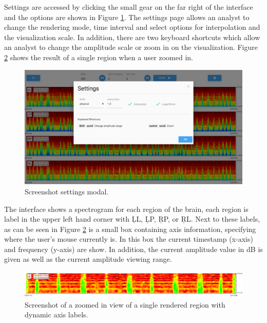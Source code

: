 Settings are accessed by clicking the small gear on the far right of the
interface and the options are shown in Figure \ref{fig:settings}. The settings
page allows an analyst to change the rendering mode, time interval and select
options for interpolation and the visualization scale. In addition, there are
two keyboard shortcuts which allow an analyst to change the amplitude scale or
zoom in on the visualization. Figure \ref{fig:zoomed-region} shows the result
of a single region when a user zoomed in. \\

\begin{figure}[h]
\begin{center}
\includegraphics[scale=0.35]{./img/settings.png}
\caption{Screenshot settings modal.}
\label{fig:settings}
\end{center}
\end{figure}

The interface shows a spectrogram for each region of the brain, each region is
label in the upper left hand corner with \c{LL}, \c{LP}, \c{RP}, or \c{RL}.
Next to these labels, as can be seen in Figure \ref{fig:zoomed-region} is a
small box containing axis information, specifying where the user's mouse
currently is. In this box the current timestamp (x-axis) and frequency (y-axis)
are show. In addition, the current amplitude value in dB is given as well as
the current amplitude viewing range. \\

\begin{figure}[h]
\begin{center}
\includegraphics[scale=0.35]{./img/zoomed-region.png}
\caption{Screenshot of a zoomed in view of a single rendered region with
  dynamic axis labels.}
\label{fig:zoomed-region}
\end{center}
\end{figure}

